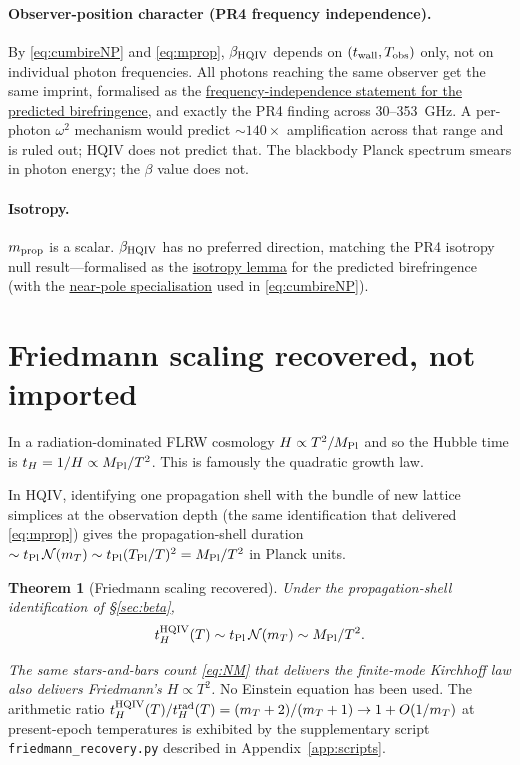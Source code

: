 \documentclass[11pt]{amsart}
\newtheorem{theorem}[definition]{Theorem}
\begin{document}
\paragraph{Observer-position character (PR4 frequency
independence).}  By \eqref{eq:cumbireNP} and \eqref{eq:mprop},
$\beta_{\rm HQIV}$ depends on $(t_{\rm wall},T_{\rm obs})$ only,
not on individual photon frequencies.  All photons reaching the
same observer get the same imprint, formalised as the
\hyperref[lean:bire-freq-indep]{frequency-independence statement
for the predicted birefringence}, and exactly the PR4 finding
\cite{eskilt2022} across 30--353~GHz. A per-photon $\omega^{2}$
mechanism would predict $\sim 140\times$ amplification across that
range and is ruled out; HQIV does not predict that. The blackbody
Planck spectrum smears in photon energy; the $\beta$ value does
not.

\paragraph{Isotropy.}  $m_{\rm prop}$ is a scalar.
$\beta_{\rm HQIV}$ has no preferred direction, matching the PR4
isotropy null result---formalised as the
\hyperref[lean:bire-isotropic]{isotropy lemma} for the predicted
birefringence (with the
\hyperref[lean:bire-isotropic-near-pole]{near-pole specialisation}
used in \eqref{eq:cumbireNP}).

\section{Friedmann scaling recovered, not imported}\label{sec:friedmann}

In a radiation-dominated FLRW cosmology $H\propto T^{2}/M_{\rm Pl}$
and so the Hubble time is $t_{H}=1/H\propto M_{\rm Pl}/T^{2}$.
This is famously the quadratic growth law.

In HQIV, identifying one propagation shell with the bundle of new
lattice simplices at the observation depth (the same identification
that delivered \eqref{eq:mprop}) gives the propagation-shell
duration $\sim t_{\rm Pl}\,\mathcal{N}(m_T)\sim t_{\rm Pl}(T_{\rm Pl}/T)^{2}
=M_{\rm Pl}/T^{2}$ in Planck units.

\begin{theorem}[Friedmann scaling recovered]\label{thm:friedmann}
Under the propagation-shell identification of \S\ref{sec:beta},
\[
  t_{H}^{\rm HQIV}(T)\sim t_{\rm Pl}\,\mathcal{N}(m_T)
                    \sim M_{\rm Pl}/T^{2}.
\]
\end{theorem}
\noindent\emph{The same stars-and-bars count \eqref{eq:NM} that
delivers the finite-mode Kirchhoff law also delivers Friedmann's
$H\propto T^{2}$.}  No Einstein equation has been used. The
arithmetic ratio $t_H^{\rm HQIV}(T)/t_H^{\rm rad}(T)
=(m_T+2)/(m_T+1)\to 1+O(1/m_T)$ at present-epoch temperatures is
exhibited by the supplementary script
\texttt{friedmann\_recovery.py} described in
Appendix~\ref{app:scripts}.
\end{document}
